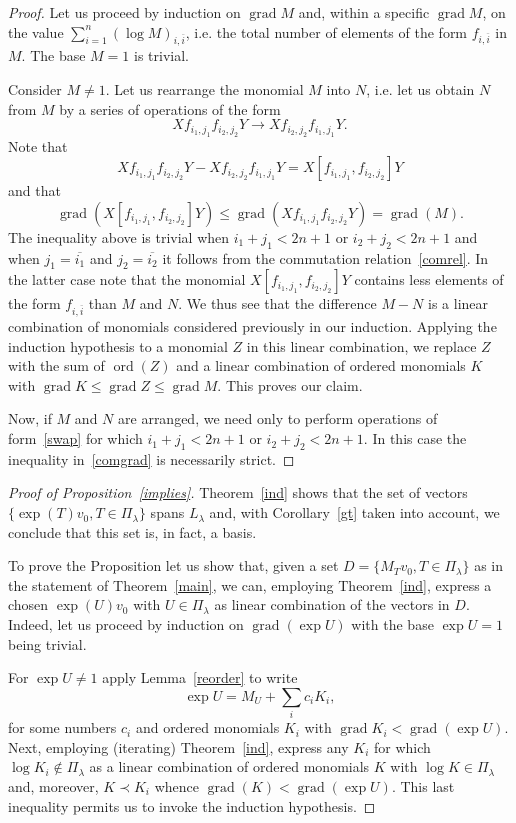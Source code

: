 \documentclass[ALCO,ThmDefs,Unicode]{cedram}
\DeclareMathOperator{\ord}{ord}
\DeclareMathOperator{\grad}{grad}
\newcommand{\la}{\lambda}
\begin{document}
\begin{proof}
Let us proceed by induction on $\grad M$ and, within a specific $\grad M$, on the value $\sum_{i=1}^n (\log M)_{i,\overline i}$, i.e. the total number of elements of the form $f_{i,\overline i}$ in $M$. The base $M=1$ is trivial.

Consider $M\neq 1$. Let us rearrange the monomial $M$ into $N$, i.e. let us obtain $N$ from $M$ by a series of operations of the form
\begin{equation}\label{swap}
Xf_{i_1,j_1}f_{i_2,j_2}Y\rightarrow Xf_{i_2,j_2}f_{i_1,j_1}Y.
\end{equation}
Note that
\[
Xf_{i_1,j_1}f_{i_2,j_2}Y-Xf_{i_2,j_2}f_{i_1,j_1}Y=X[f_{i_1,j_1},f_{i_2,j_2}]Y
\]
and that
\begin{equation}\label{comgrad}
\grad(X[f_{i_1,j_1},f_{i_2,j_2}]Y)\le\grad(Xf_{i_1,j_1}f_{i_2,j_2}Y)=\grad(M).
\end{equation}
The inequality above is trivial when $i_1+j_1<2n+1$ or $i_2+j_2<2n+1$ and when $j_1=\overline{i_1}$ and $j_2=\overline{i_2}$ it follows from the commutation relation~\eqref{comrel}. In the latter case note that the monomial $X[f_{i_1,j_1},f_{i_2,j_2}]Y$ contains less elements of the form $f_{i,\overline i}$ than $M$ and $N$. We thus see that the difference $M-N$ is a linear combination of monomials considered previously in our induction. Applying the induction hypothesis to a monomial $Z$ in this linear combination, we replace $Z$ with the sum of $\ord(Z)$ and a linear combination of ordered monomials $K$ with $\grad K\le\grad Z\le\grad M$. This proves our claim.

Now, if $M$ and $N$ are arranged, we need only to perform operations of form~\eqref{swap} for which $i_1+j_1<2n+1$ or $i_2+j_2<2n+1$. In this case the inequality in~\eqref{comgrad} is necessarily strict.
\end{proof}

\begin{proof}[Proof of Proposition~\ref{implies}]
Theorem~\ref{ind} shows that the set of vectors $\{\exp(T)v_0,T\in\Pi_\lambda\}$ spans $L_\la$ and, with Corollary~\ref{gt} taken into account, we conclude that this set is, in fact, a basis.

To prove the Proposition let us show that, given a set $D=\{M_T v_0,T\in\Pi_\la\}$ as in the statement of Theorem~\ref{main}, we can, employing Theorem~\ref{ind}, express a chosen $\exp(U) v_0$ with $U\in\Pi_\la$ as linear combination of the vectors in $D$. Indeed, let us proceed by induction on $\grad(\exp U)$ with the base $\exp U=1$ being trivial.

For $\exp U\neq 1$ apply Lemma~\ref{reorder} to write
\[
\exp U=M_U+\sum_i c_i K_i,
\]
for some numbers $c_i$ and ordered monomials $K_i$ with $\grad K_i<\grad(\exp U)$. Next, employing (iterating) Theorem~\ref{ind}, express any $K_i$ for which $\log K_i\notin\Pi_\lambda$ as a linear combination of ordered monomials $K$ with $\log K\in\Pi_\lambda$ and, moreover, $K\prec K_i$ whence $\grad(K)<\grad(\exp U)$. This last inequality permits us to invoke the induction hypothesis.
\end{proof}
\end{document}
